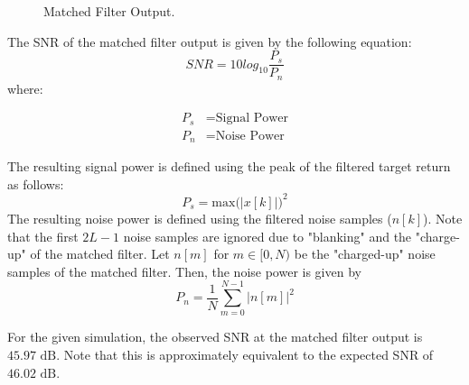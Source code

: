 \documentclass[conference]{IEEEtran}
\begin{document}
\begin{figure}[H]
\centerline{}
\caption{Matched Filter Output.}
\label{mf_output}
\end{figure}
\noindent
The SNR of the matched filter output is given by the following equation:
\begin{equation}
SNR = 10log_{10}\frac{P_s}{P_n}
\end{equation}
where:
\begin{fleqn}[\parindent]
\begin{align*}
P_s &= \text{Signal Power}\\
P_n &= \text{Noise Power}
\end{align*}
\end{fleqn}
The resulting signal power is defined using the peak of the filtered target return as follows:
\begin{equation}
P_s = \text{max(}|x[k]|\text{)}^2
\end{equation}
The resulting noise power is defined using the filtered noise samples ($n[k]$). Note that the first $2L-1$ noise samples are ignored due to "blanking" and the "charge-up" of the matched filter. Let $n[m]$ for $m \in [0, N)$ be the "charged-up" noise samples of the matched filter. Then, the noise power is given by
\begin{equation}
P_n = \frac{1}{N}\sum_{m=0}^{N-1}|n[m]|^2
\end{equation}
\par
For the given simulation, the observed SNR at the matched filter output is $45.97 \text{ dB}$. Note that this is approximately equivalent to the expected SNR of $46.02 \text{ dB}$.
\end{document}
